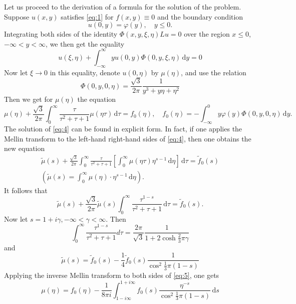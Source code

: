 \documentclass[a4paper,12pt]{article}
\newcommand{\dd}{\,\mathrm{d}}
\begin{document}
Let us proceed to the derivation of a formula for the solution of the problem.
Suppose $u(x, y)$ satisfies \eqref{eq:1} for $f(x, y) \equiv 0$ and the boundary condition
\begin{equation} \label{eq:2}
u(0, y)=\varphi(y), \quad y \leqslant 0 .
\end{equation}
Integrating both sides of the identity $\Phi(x,y,\xi,\eta) Lu = 0$ over the region $x \leq 0$, 
 $-\infty < y<\infty$, we then get the equality
\begin{equation} \label{eq:3}
	u(\xi, \eta)+\int_{-\infty}^{\infty} y u(0, y)\Phi(0, y, \xi, \eta) \dd y=0
\end{equation}
Now let $\xi \rightarrow 0$ in this equality, denote $u(0, \eta)$ by $\mu(\eta)$, and use the relation
$$
\Phi(0, y, 0, \eta)=\frac{\sqrt{3}}{2 \pi} \frac{1}{y^{3}+y \eta+\eta^{2}}
$$
Then we get for $\mu(\eta)$ the equation
\begin{equation} \label{eq:4}
	\mu(\eta)+\frac{\sqrt{3}}{2 \pi} \int_{0}^{\infty} \frac{\tau}{\tau^{2}+\tau+1} \mu(\eta \tau) \dd \tau=f_{0}(\eta), \quad f_{0}(\eta)=-\int_{-\infty}^{0} y \varphi(y) \Phi(0, y, 0, \eta) \dd y .
\end{equation}
The solution of \eqref{eq:4} can be found in explicit form. In fact, if one applies the Mellin transform to the left-hand right-hand sides of \eqref{eq:4}, then one obtains the new equation
\begin{gather*}
	\tilde{\mu}(s)+\frac{\sqrt{3}}{2 \pi} \int_{0}^{\infty} \frac{\tau}{\tau^{2}+\tau+1}\left[\int_{0}^{\infty} \mu(\eta \tau) \eta^{s-1} \dd \eta\right] \dd \tau=\tilde{f}_{0}(s) \\
	\left(\tilde{\mu}(s)=\int_{0}^{\infty} \mu(\eta) \cdot \eta^{s-1} \dd \eta\right).
\end{gather*}
It follows that
$$
\tilde{\mu}(s)+\frac{\sqrt{3}}{2 \pi} \tilde{\mu}(s) \int_{0}^{\infty} \frac{\tau^{1-s}}{\tau^{2}+\tau+1} \dd \tau=\tilde{f}_{0}(s).
$$
Now let $s=1+i \gamma,-\infty<\gamma<\infty$. Then
$$
\int_{0}^{\infty} \frac{\tau^{1-s}}{\tau^{2}+\tau+1} d \tau=\frac{2 \pi}{\sqrt{3}} \frac{1}{1+2 \cosh \frac{2}{3} \pi \gamma}
$$
and
\begin{equation} \label{eq:5}
	\tilde{\mu}(s)=\tilde{f}_{0}(s)-\frac{1}{4} \tilde{f}_{0}(s) \frac{1}{\cos ^{2} \frac{1}{3}\pi(1-s)}
\end{equation}
Applying the inverse Mellin transform to both sides of \eqref{eq:5}, one gets
$$
\mu(\eta)=f_{0}(\eta)-\frac{1}{8 \pi i} \int_{1-i \infty}^{1+i \infty} f_{0}(s) \frac{\eta^{-s}}{\cos ^{2} \frac{1}{3} \pi(1-s)} \dd s
$$
\end{document}
